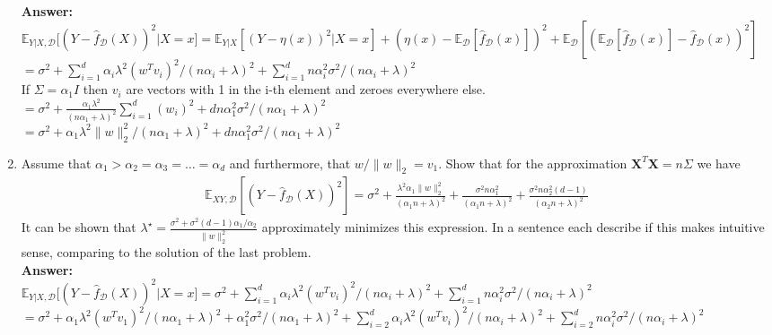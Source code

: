 \documentclass{article}
\newcommand{\1}{\mathbf{1}}
\def\E{\mathbb{E}}
\newcommand{\mb}[1]{\mathbf{#1}}
\newcommand{\mc}[1]{\mathcal{#1}}
\begin{document}
\begin{enumerate}
    \textbf{Answer:}\\
    
    $\E_{Y|X,\mc{D}}\big[(Y-\widehat{f}_{\mc{D}}(X))^2 |X=x \big] = \E_{Y|X}[ (Y-\eta(x))^2 | X=x] + (\eta(x)-\E_{\mc{D}}[\widehat{f}_{\mc{D}}(x)])^2 + \E_{\mc{D}}[ ( \E_{\mc{D}}[\widehat{f}_{\mc{D}}(x)] - \widehat{f}_{\mc{D}}(x))^2]$
    $=\sigma^2 +\sum_{i=1}^d \alpha_i \lambda^2 (w^T v_i)^2 /(n\alpha_i + \lambda) ^2 +\sum_{i=1}^d n \alpha_i^2 \sigma^2 /(n\alpha_i + \lambda)^2$\\
    
    If $\Sigma =\alpha_1 I$ then $v_i$ are vectors with 1 in the i-th element and zeroes everywhere else.\\
    $=\sigma^2 +\frac{\alpha_1 \lambda^2}  {(n\alpha_1 + \lambda) ^2} \sum_{i=1}^d (w_i)^2+d n \alpha_1^2 \sigma^2 /(n\alpha_1 + \lambda)^2$\\
     $=\sigma^2 +\alpha_1 \lambda^2 \|w\|_2^2 /(n\alpha_1 + \lambda) ^2 +d n \alpha_1^2 \sigma^2 /(n\alpha_1 + \lambda)^2$\\
    
    
    \item Assume that $\alpha_1 > \alpha_2 = \alpha_3 = \dots = \alpha_d$ and furthermore, that $w/\|w\|_2 = v_1$. Show that for the approximation $\mb{X}^T \mb{X} = n \Sigma$ we have
    \begin{align*}
    \E_{XY,\mc{D}}[ (Y-\widehat{f}_{\mc{D}}(X))^2] = \sigma^2 + \frac{\lambda^2 \alpha_1 \|w\|_2^2}{(\alpha_1 n+\lambda)^2} + \frac{\sigma^2 n \alpha_1^2}{(\alpha_1 n + \lambda)^2} + \frac{\sigma^2 n \alpha_2^2 (d-1)}{(\alpha_2 n + \lambda)^2}
    \end{align*}
    It can be shown that $\lambda^\star = \frac{\sigma^2 + \sigma^2(d-1)\alpha_1/\alpha_2}{\|w\|_2^2}$ approximately minimizes this expression. 
    In a sentence each describe if this makes intuitive sense, comparing to the solution of the last problem.\\
    
    \textbf{Answer:}\\
    
    $\E_{Y|X,\mc{D}}\big[(Y-\widehat{f}_{\mc{D}}(X))^2 |X=x \big] =\sigma^2 +\sum_{i=1}^d \alpha_i \lambda^2 (w^T v_i)^2 /(n\alpha_i + \lambda) ^2 +\sum_{i=1}^d n \alpha_i^2 \sigma^2 /(n\alpha_i + \lambda)^2$\\
    $=\sigma^2 +\alpha_1 \lambda^2 (w^T v_1)^2 /(n\alpha_1 + \lambda) ^2 + \alpha_1^2 \sigma^2 /(n\alpha_1 + \lambda)^2 +\sum_{i=2}^d \alpha_i \lambda^2 (w^T v_i)^2 /(n\alpha_i + \lambda) ^2 +\sum_{i=2}^d n \alpha_i^2 \sigma^2 /(n\alpha_i + \lambda)^2$\\
    

\end{enumerate}
\end{document}
